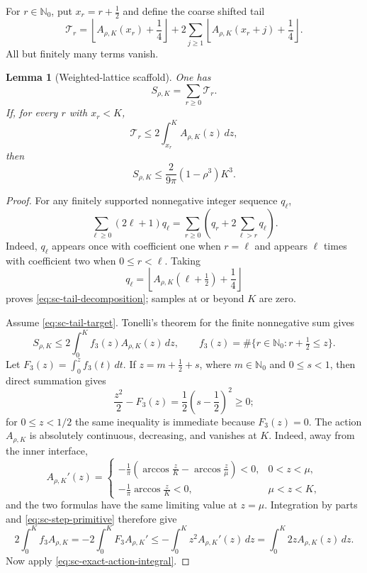 \documentclass[11pt]{article}
\numberwithin{equation}{section}
\newtheorem{lemma}[theorem]{Lemma}
\theoremstyle{definition}
\theoremstyle{remark}
\begin{document}
For \(r\in\mathbb N_0\), put \(x_r=r+\tfrac12\) and define the coarse shifted
tail
\begin{equation}
  \mathcal T_r=
  \left\lfloor A_{\rho,K}(x_r)+\frac14\right\rfloor
  +2\sum_{j\ge1}
  \left\lfloor A_{\rho,K}(x_r+j)+\frac14\right\rfloor.
  \label{eq:sc-shifted-tail}
\end{equation}
All but finitely many terms vanish.

\begin{lemma}[Weighted-lattice scaffold]
\label{lem:sc-weighted-scaffold}
One has
\begin{equation}
  S_{\rho,K}=\sum_{r\ge0}\mathcal T_r.
  \label{eq:sc-tail-decomposition}
\end{equation}
If, for every \(r\) with \(x_r<K\),
\begin{equation}
  \mathcal T_r\le2\int_{x_r}^{K}A_{\rho,K}(z)\,dz,
  \label{eq:sc-tail-target}
\end{equation}
then
\begin{equation}
  S_{\rho,K}\le
  \frac{2}{9\pi}(1-\rho^3)K^3.
  \label{eq:sc-scaffold-conclusion}
\end{equation}
\end{lemma}

\begin{proof}
For any finitely supported nonnegative integer sequence \(q_\ell\),
\[
  \sum_{\ell\ge0}(2\ell+1)q_\ell
  =\sum_{r\ge0}\left(q_r+2\sum_{\ell>r}q_\ell\right).
\]
Indeed, \(q_\ell\) appears once with coefficient one when \(r=\ell\) and
appears \(\ell\) times with coefficient two when \(0\le r<\ell\).  Taking
\[
  q_\ell=\left\lfloor
  A_{\rho,K}(\ell+\tfrac12)+\frac14\right\rfloor
\]
proves \eqref{eq:sc-tail-decomposition}; samples at or beyond \(K\) are
zero.

Assume \eqref{eq:sc-tail-target}.  Tonelli's theorem for the finite
nonnegative sum gives
\[
  S_{\rho,K}
  \le2\int_0^K f_3(z)A_{\rho,K}(z)\,dz,
  \qquad
  f_3(z)=\#\{r\in\mathbb N_0:r+\tfrac12\le z\}.
\]
Let \(F_3(z)=\int_0^zf_3(t)\,dt\).  If
\(z=m+\tfrac12+s\), where \(m\in\mathbb N_0\) and \(0\le s<1\), then direct
summation gives
\begin{equation}
  \frac{z^2}{2}-F_3(z)
  =\frac12\left(s-\frac12\right)^2\ge0;
  \label{eq:sc-step-primitive}
\end{equation}
for \(0\le z<1/2\) the same inequality is immediate because \(F_3(z)=0\).
The action \(A_{\rho,K}\) is absolutely continuous, decreasing, and vanishes
at \(K\).  Indeed, away from the inner interface,
\[
  A_{\rho,K}'(z)=
  \begin{cases}
  \displaystyle-\frac1\pi\left(
  \arccos\frac zK-\arccos\frac z\mu\right)<0,
  &0<z<\mu,\\[2mm]
  \displaystyle-\frac1\pi\arccos\frac zK<0,
  &\mu<z<K,
  \end{cases}
\]
and the two formulas have the same limiting value at \(z=\mu\).
Integration by parts and \eqref{eq:sc-step-primitive} therefore
give
\[
  2\int_0^Kf_3A_{\rho,K}
  =-2\int_0^KF_3A_{\rho,K}'
  \le-\int_0^Kz^2A_{\rho,K}'(z)\,dz
  =\int_0^K2zA_{\rho,K}(z)\,dz.
\]
Now apply \eqref{eq:sc-exact-action-integral}.
\end{proof}
\end{document}
